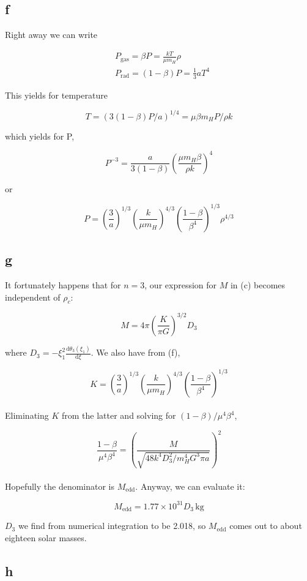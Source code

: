 \documentclass[12pt]{article}
\newcommand{\pfrac}[2]{\left(\frac{#1}{#2} \right)}
\begin{document}
\subsection*{f}

Right away we can write

\begin{align*}
&P_{\mathrm{gas}} = \beta P = \frac{kT}{\mu m_H}\rho\\
&P_{\mathrm{rad}} = (1-\beta)P = \frac{1}{3}aT^4
\end{align*}

This yields for temperature

\[ T = (3(1-\beta)P/a)^{1/4} = \mu\beta m_H P / \rho k
\]

which yields for P,

\[ P^{-3} = \frac{a}{3(1-\beta)}\left(\frac{\mu m_H \beta}{\rho k}  \right)^4
\]

or

\[ P =  \pfrac{3}{a}^{1/3}  \pfrac{k}{\mu m_H}^{4/3} \pfrac{1-\beta}{\beta^4}^{1/3}  \rho^{4/3}
\]

\subsection*{g}

It fortunately happens that for \(n=3\), our expression for \(M\) in (c) becomes independent of \(\rho_c\):

\[ M = 4\pi \pfrac{K}{\pi G}^{3/2} D_3
\]

where \(D_3 = -\xi_1^2\frac{\mathrm{d}\theta_3(\xi_1)}{\mathrm{d}\xi}\). We also have from (f),

\[ K =  \pfrac{3}{a}^{1/3}  \pfrac{k}{\mu m_H}^{4/3} \pfrac{1-\beta}{\beta^4}^{1/3}
\]\\

Eliminating \(K\) from the latter and solving for \( (1-\beta)/\mu^4\beta^4\),

\[ \frac{1-\beta}{\mu^4\beta^4} = \pfrac{M}{\sqrt{48k^4D_3^2/m_H^4 G^3\pi a} }^2
\]\\

Hopefully the denominator is \(M_{\mathrm{edd}}\). Anyway, we can evaluate it:

\[ M_{\mathrm{edd}} = 1.77 \times 10^{31} D_3 \, \mathrm{kg}
\]

\(D_3\) we find from numerical integration to be 2.018, so \(M_{\mathrm{edd}}\) comes out to about eighteen solar masses.

\subsection*{h}
\end{document}
